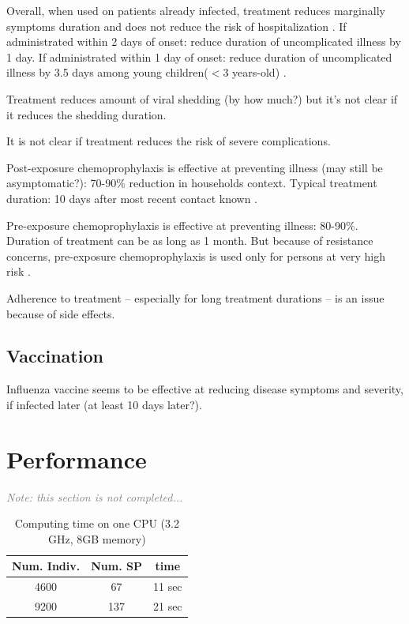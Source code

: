 \documentclass[11pt, onecolumn]{article}
\newcommand{\note}[1]{\textit{\textcolor{Grey}{Note: #1}}}
\begin{document}
Overall, when used on patients already infected, treatment reduces marginally symptoms duration and does not reduce the risk of hospitalization \cite{Ebell:2014ic,Jefferson:2014ei}. 
If administrated within 2 days of onset: reduce duration of uncomplicated illness by 1 day.
If administrated within 1 day of onset: reduce duration of uncomplicated illness by 3.5 days among young children($<3$ years-old) \cite{CDC:2011wq}.

Treatment reduces amount of viral shedding (by how much?) but it's not clear if it reduces the shedding duration.

It is not clear if treatment reduces the risk of severe complications.

Post-exposure chemoprophylaxis is effective at preventing illness (may still be asymptomatic?): 70-90\% reduction in households context. Typical treatment duration: 10 days after most recent contact known \cite{CDC:2011wq}.

Pre-exposure chemoprophylaxis is effective at preventing illness: 80-90\%. Duration of treatment can be as long as 1 month. But because of resistance concerns, pre-exposure chemoprophylaxis is used only for persons at very high risk \cite{CDC:2011wq}. 

Adherence to treatment -- especially for long treatment durations -- is an issue because of side effects.



\subsection{Vaccination}

Influenza vaccine seems to be effective at reducing disease symptoms and severity, if infected later (at least 10 days later?).


\section{Performance}

\note{this section is not completed...}


\begin{table}[htdp]
\caption{Computing time on one CPU (3.2 GHz, 8GB memory) }
\begin{center}
\begin{tabular}{|ccc|}
\hline
Num. Indiv. & Num. SP & time\\
\hline
4600 & 67 & 11 sec\\
9200 & 137 & 21 sec\\

\hline
\end{tabular}
\end{center}
\label{default}
\end{table}%
\end{document}
